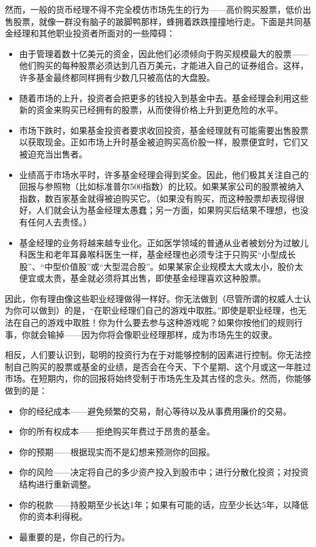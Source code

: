 \documentclass[12pt,oneside]{book}
\begin{document}
然而，一般的货币经理不得不完全模仿市场先生的行为——高价购买股票，低价出售股票，就像一群没有脑子的跛脚鸭那样，蜂拥着跌跌撞撞地行走。下面是共同基金经理和其他职业投资者所面对的一些障碍：
\begin{itemize}
\item 由于管理着数十亿美元的资金，因此他们必须倾向于购买规模最大的股票——他们购买的每种股票必须达到几百万美元，才能进入自己的证券组合。这样，许多基金最终都同样拥有少数几只被高估的大盘股。
\item 随着市场的上升，投资者会把更多的钱投入到基金中去。基金经理会利用这些新的资金来购买已经拥有的股票，从而使得价格上升到更危险的水平。
\item 市场下跌时，如果基金投资者要求收回投资，基金经理就有可能需要出售股票以获取现金。正如市场上升时基金被迫购买高价股一样，股票便宜时，它们又被迫充当出售者。
\item 业绩高于市场水平时，许多基金经理会得到奖金。因此，他们极其关注自己的回报与参照物（比如标准普尔500指数）的比较。如果某家公司的股票被纳入指数，数百家基金就得被迫购买它。（如果没有购买，而这种股票却表现得很好，人们就会认为基金经理太愚蠢；另一方面，如果购买后结果不理想，也没有任何人去责怪。）
\item 基金经理的业务将越来越专业化。正如医学领域的普通从业者被划分为过敏儿科医生和老年耳鼻喉科医生一样，基金经理也必须专注于只购买“小型成长股”、“中型价值股”或“大型混合股”。如果某家企业规模太大或太小，股价太便宜或太贵，基金就必须将其出售，即使基金经理喜欢这种股票。
\end{itemize}

因此，你有理由像这些职业经理做得一样好。你无法做到（尽管所谓的权威人士认为你可以做到）的是，“在职业经理们自己的游戏中取胜。”即使是职业经理，也无法在自己的游戏中取胜！你为什么要去参与这种游戏呢？如果你按他们的规则行事，你就会输掉——因为你将会像职业经理那样，成为市场先生的奴隶。

相反，人们要认识到，聪明的投资行为在于对能够控制的因素进行控制。你无法控制自己购买的股票或基金的业绩，是否会在今天、下个星期、这个月或这一年胜过市场。在短期内，你的回报将始终受制于市场先生及其古怪的念头。然而，你能够做到的是：

\begin{itemize}
\item 你的经纪成本——避免频繁的交易，耐心等待以及从事费用廉价的交易。
\item 你的所有权成本——拒绝购买年费过于昂贵的基金。
\item 你的预期——根据现实而不是幻想来预测你的回报。
\item 你的风险——决定将自己的多少资产投入到股市中；进行分散化投资；对投资结构进行重新调整。
\item 你的税款——持股期至少长达1年；如果有可能的话，应至少长达5年，以降低你的资本利得税。
\item 最重要的是，你自己的行为。
\end{itemize}
\end{document}
